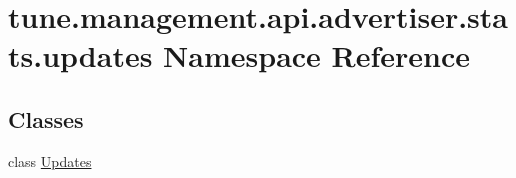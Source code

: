 \hypertarget{namespacetune_1_1management_1_1api_1_1advertiser_1_1stats_1_1updates}{\section{tune.\-management.\-api.\-advertiser.\-stats.\-updates Namespace Reference}
\label{namespacetune_1_1management_1_1api_1_1advertiser_1_1stats_1_1updates}
}
\subsection*{Classes}
\begin{DoxyCompactItemize}
\item 
class \hyperlink{classtune_1_1management_1_1api_1_1advertiser_1_1stats_1_1updates_1_1Updates}{Updates}
\end{DoxyCompactItemize}
